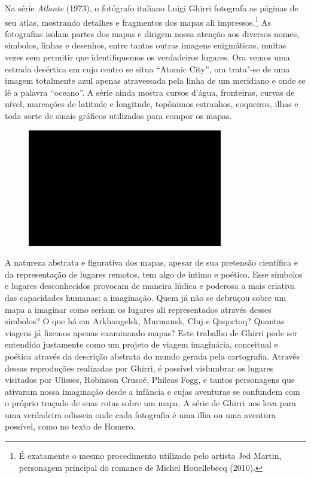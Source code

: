 Na série \emph{Atlante} (1973), o fotógrafo italiano Luigi Ghirri
fotografa as páginas de seu atlas, mostrando detalhes e fragmentos dos
mapas ali impressos.\footnote{É exatamente o mesmo procedimento utilizado
  pelo artista Jed Martin, personagem principal do romance de Michel
  Houellebecq {} (2010).} As fotografias
isolam partes dos mapas e dirigem nossa atenção aos diversos nomes,
símbolos, linhas e desenhos, entre tantas outras imagens enigmáticas,
muitas vezes sem permitir que identifiquemos os verdadeiros lugares. Ora
vemos uma estrada desértica em cujo centro se situa ``Atomic City'', ora
trata"-se de uma imagem totalmente azul apenas atravessada pela linha de
um meridiano e onde se lê a palavra ``oceano''. A série ainda mostra
cursos d'água, fronteiras, curvas de nível, marcações de latitude e
longitude, topônimos estranhos, coqueiros, ilhas e toda sorte de sinais
gráficos utilizados para compor os mapas.

\begin{figure}[!ht]

\centering
 \includegraphics[width=85mm]{./imgs/im1.jpg}
\caption{\tiny{}}

\end{figure}

A natureza abstrata e figurativa dos mapas, apesar de sua pretensão
científica e da representação de lugares remotos, tem algo de íntimo e
poético. Esse símbolos e lugares desconhecidos provocam de maneira
lúdica e poderosa a mais criativa das capacidades humanas: a imaginação.
Quem já não se debruçou sobre um mapa a imaginar como seriam os lugares
ali representados através desses símbolos? O que há em Arkhangelsk,
Murmansk, Cluj e Qaqortoq? Quantas viagens já fizemos apenas examinando
mapas? Este trabalho de Ghirri pode ser entendido justamente como um
projeto de viagem imaginária, conceitual e poética através da descrição
abstrata do mundo gerada pela cartografia. Através dessas reproduções
realizadas por Ghirri, é possível vislumbrar os lugares visitados por
Ulisses, Robinson Crusoé, Phileas Fogg, e tantos personagens que
ativaram nossa imaginação desde a infância e cujas aventuras se
confundem com o próprio traçado de suas rotas sobre um mapa. A série de
Ghirri nos leva para uma verdadeira odisseia onde cada fotografia é uma
ilha ou uma aventura possível, como no texto de Homero.

